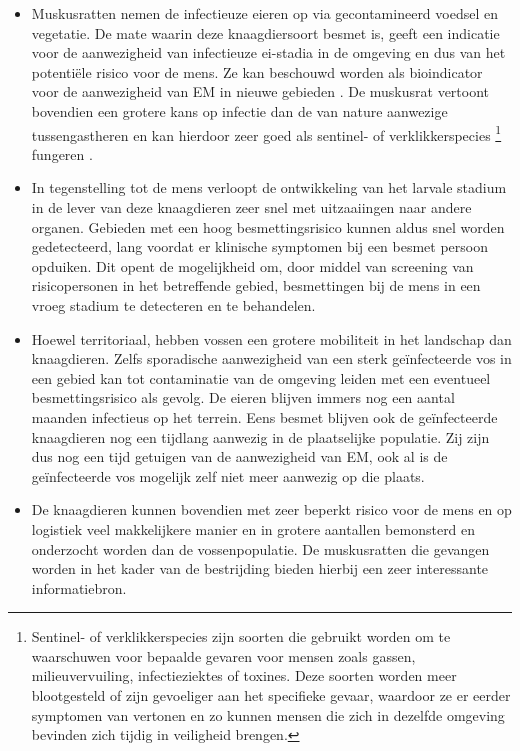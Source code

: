 \documentclass[twoside]{extreport}
\begin{document}
\begin{itemize}
\tightlist
\item
  Muskusratten nemen de infectieuze eieren op via gecontamineerd voedsel
  en vegetatie. De mate waarin deze knaagdiersoort besmet is, geeft een
  indicatie voor de aanwezigheid van infectieuze ei-stadia in de
  omgeving en dus van het potentiële risico voor de mens. Ze kan
  beschouwd worden als bioindicator voor de aanwezigheid van EM in
  nieuwe gebieden \citep{reperant2009rodents, umhang2013nutrias}. De
  muskusrat vertoont bovendien een grotere kans op infectie dan de van
  nature aanwezige tussengastheren en kan hierdoor zeer goed als
  sentinel- of verklikkerspecies \footnote{Sentinel- of
    verklikkerspecies zijn soorten die gebruikt worden om te waarschuwen
    voor bepaalde gevaren voor mensen zoals gassen, milieuvervuiling,
    infectieziektes of toxines. Deze soorten worden meer blootgesteld of
    zijn gevoeliger aan het specifieke gevaar, waardoor ze er eerder
    symptomen van vertonen en zo kunnen mensen die zich in dezelfde
    omgeving bevinden zich tijdig in veiligheid brengen.} fungeren
  \citep{hanosset2008echinococcus}.
\item
  In tegenstelling tot de mens verloopt de ontwikkeling van het larvale
  stadium in de lever van deze knaagdieren zeer snel met uitzaaiingen
  naar andere organen. Gebieden met een hoog besmettingsrisico kunnen
  aldus snel worden gedetecteerd, lang voordat er klinische symptomen
  bij een besmet persoon opduiken. Dit opent de mogelijkheid om, door
  middel van screening van risicopersonen in het betreffende gebied,
  besmettingen bij de mens in een vroeg stadium te detecteren en te
  behandelen.
\item
  Hoewel territoriaal, hebben vossen een grotere mobiliteit in het
  landschap dan knaagdieren. Zelfs sporadische aanwezigheid van een
  sterk geïnfecteerde vos in een gebied kan tot contaminatie van de
  omgeving leiden met een eventueel besmettingsrisico als gevolg. De
  eieren blijven immers nog een aantal maanden infectieus op het
  terrein. Eens besmet blijven ook de geïnfecteerde knaagdieren nog een
  tijdlang aanwezig in de plaatselijke populatie. Zij zijn dus nog een
  tijd getuigen van de aanwezigheid van EM, ook al is de geïnfecteerde
  vos mogelijk zelf niet meer aanwezig op die plaats.
\item
  De knaagdieren kunnen bovendien met zeer beperkt risico voor de mens
  en op logistiek veel makkelijkere manier en in grotere aantallen
  bemonsterd en onderzocht worden dan de vossenpopulatie. De
  muskusratten die gevangen worden in het kader van de bestrijding
  bieden hierbij een zeer interessante informatiebron.
\end{itemize}
\end{document}
